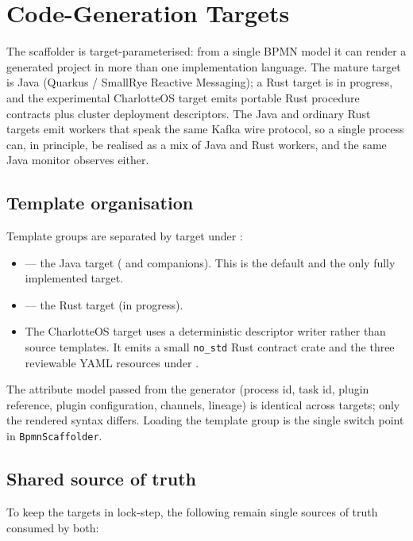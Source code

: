 \section{Code-Generation Targets}
\label{sec:RustTarget}

The scaffolder is target-parameterised: from a single BPMN model it can render a
generated project in more than one implementation language. The mature target is
Java (Quarkus / SmallRye Reactive Messaging); a Rust target is in progress, and
the experimental CharlotteOS target emits portable Rust procedure contracts plus
cluster deployment descriptors. The Java and ordinary Rust targets emit workers
that speak the same Kafka wire protocol, so a single process
can, in principle, be realised as a mix of Java and Rust workers, and the same
Java monitor observes either.

\subsection{Template organisation}

Template groups are separated by target under :

\begin{itemize}
\item {} --- the Java target ( and
  companions). This is the default and the only fully implemented target.
\item {} --- the Rust target (in progress).
\item The CharlotteOS target uses a deterministic descriptor writer rather than
  source templates. It emits a small \texttt{no\_std} Rust contract crate and the
  three reviewable YAML resources under .
\end{itemize}

The attribute model passed from the generator (process id, task id, plugin
reference, plugin configuration, channels, lineage) is identical across targets;
only the rendered syntax differs. Loading the template group is the single
switch point in \texttt{BpmnScaffolder}.

\subsection{Shared source of truth}

To keep the targets in lock-step, the following remain single sources of truth
consumed by both:

